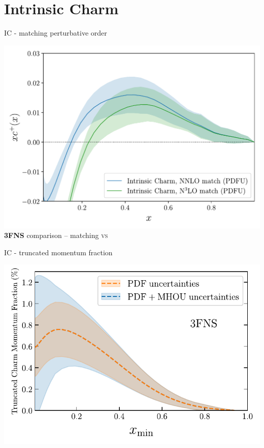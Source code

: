 \documentclass[9pt]{beamer}
\begin{document}
\section{Intrinsic Charm}

\begin{frame}{IC - matching perturbative order}
	\begin{center}
		\includegraphics[width=.9\linewidth]{3fns_nnlo_n3lo}\\
                \textbf{3FNS} comparison -- \nnlo matching \textsc{vs} \nnnlo
	\end{center}
\end{frame}
\begin{frame}{IC - truncated momentum fraction}
	\begin{center}
		\includegraphics[width=\linewidth]{charm_momfrac_xmin_dep_3fns.pdf}
	\end{center}
\end{frame}
\end{document}
